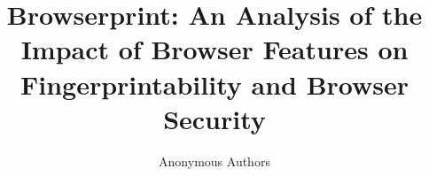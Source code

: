 \documentclass[runningheads]{llncs}
\begin{document}
\title{Browserprint: An Analysis of the Impact of Browser Features on Fingerprintability and Browser Security}




\author{Anonymous Authors}

\UseRawInputEncoding
\maketitle











\end{document}

